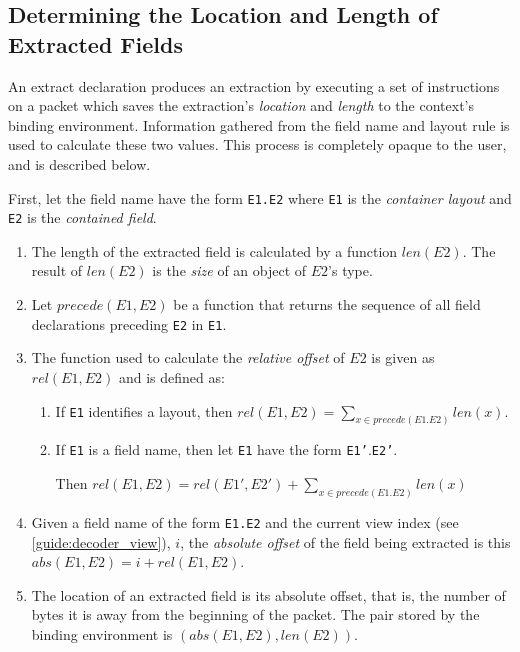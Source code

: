 \subsection{Determining the Location and Length of Extracted Fields}

An extract declaration produces an extraction by executing a set of instructions on a packet which saves the extraction's \textit{location} and \textit{length} to the context's binding environment. Information gathered from the field name and layout rule is used to calculate these two values. This process is completely opaque to the user, and is described below.

First, let the field name have the form \texttt{E1.E2} where \texttt{E1} is the \textit{container layout} and \texttt{E2} is the \textit{contained field}.

\begin{enumerate}
\item The length of the extracted field is calculated by a function $len(E2)$. The result of $len(E2)$ is the \textit{size} of an object of $E2$'s type.

\item  Let $precede(E1, E2)$ be a function that returns the sequence of all field declarations preceding \texttt{E2} in \texttt{E1}. 

\item The function used to calculate the \textit{relative offset} of $E2$ is given as $rel(E1, E2)$ and is defined as:

\begin{enumerate}

\item If \texttt{E1} identifies a layout, then $rel(E1, E2) = \sum_{x \in precede(E1.E2)}{} len(x)$.

\item If \texttt{E1} is a field name, then let \texttt{E1} have the form \texttt{E1'}.\texttt{E2'}.

Then $rel(E1, E2)=rel(E1', E2') + \sum_{x \in precede(E1.E2)}{} len(x)$

\end{enumerate}

\item Given a field name of the form \texttt{E1.E2} and the current view index (see \ref{guide:decoder_view}), $i$, the \textit{absolute offset} of the field being extracted is this $abs(E1, E2) = i + rel(E1, E2)$.

\item The location of an extracted field is its absolute offset, that is, the number of bytes it is away from the beginning of the packet. The pair stored by the binding environment is $(abs(E1, E2), len(E2))$.

\end{enumerate}

